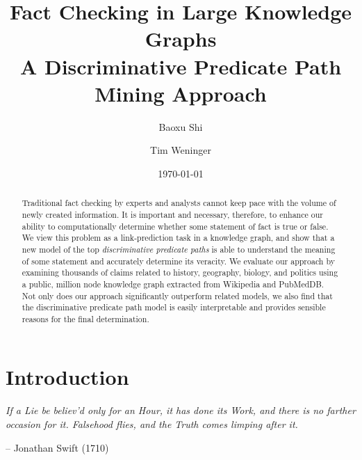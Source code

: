 \documentclass[reprint,twocolumn,showpacs,preprintnumbers,amsmath, aps,pre,amssymb]{revtex4-1}
\begin{document}
\label{firstpage}


\title{Fact Checking in Large Knowledge Graphs \\ A Discriminative Predicate Path Mining Approach}

\author{Baoxu Shi}
\author{Tim Weninger}
%
\date{\today}







\begin{abstract}
Traditional fact checking by experts and analysts cannot keep pace with the volume of newly created information. It is important and necessary, therefore, to enhance our ability to computationally determine whether some statement of fact is true or false. We view this problem as a link-prediction task in a knowledge graph, and show that a new model of the top \emph{discriminative predicate paths} is able to understand the meaning of some statement and accurately determine its veracity. We evaluate our approach by examining thousands of claims related to history, geography, biology, and politics using a public, million node knowledge graph extracted from Wikipedia and PubMedDB. Not only does our approach significantly outperform related models, we also find that the discriminative predicate path model is easily interpretable and provides sensible reasons for the final determination. 
\end{abstract}

\maketitle

\section{Introduction} \label{sec:introduction}


\begin{adjustbox}{minipage=0.82\linewidth,margin=0pt \smallskipamount,center}
        \begin{raggedright}
        \textit{\small{If a Lie be believ'd only for an Hour, it has done its Work, and there is no farther occasion for it. Falsehood flies, and the Truth comes limping after it.}}
        \end{raggedright}
        \begin{flushright}
        \vspace{-4pt}
        \small{-- Jonathan Swift (1710)~\cite{Swift1710}}
        \end{flushright}
        \vspace{2pt}
\end{adjustbox}
\end{document}

